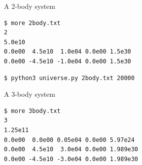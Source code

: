\documentclass[8pt,a4paper,compress]{beamer}
\begin{document}
\begin{frame}[fragile]
\pause
\begin{minipage}{200pt}
A 2-body system
\begin{lstlisting}[language={},style=focusin]
$ more 2body.txt
2 
5.0e10 
0.0e00  4.5e10  1.0e04 0.0e00 1.5e30 
0.0e00 -4.5e10 -1.0e04 0.0e00 1.5e30 
\end{lstlisting}

\begin{lstlisting}[language={},style=focusin]
$ python3 universe.py 2body.txt 20000
\end{lstlisting}
\end{minipage}%
\hfill
\begin{minipage}{100pt}
\begin{center}
\end{center}
\end{minipage}

\pause
\smallskip

\begin{minipage}{200pt}
A 3-body system
\begin{lstlisting}[language={},style=focusin]
$ more 3body.txt
3 
1.25e11 
0.0e00  0.0e00 0.05e04 0.0e00 5.97e24 
0.0e00  4.5e10  3.0e04 0.0e00 1.989e30 
0.0e00 -4.5e10 -3.0e04 0.0e00 1.989e30 
\end{lstlisting}


\end{minipage}
\end{frame}
\end{document}
